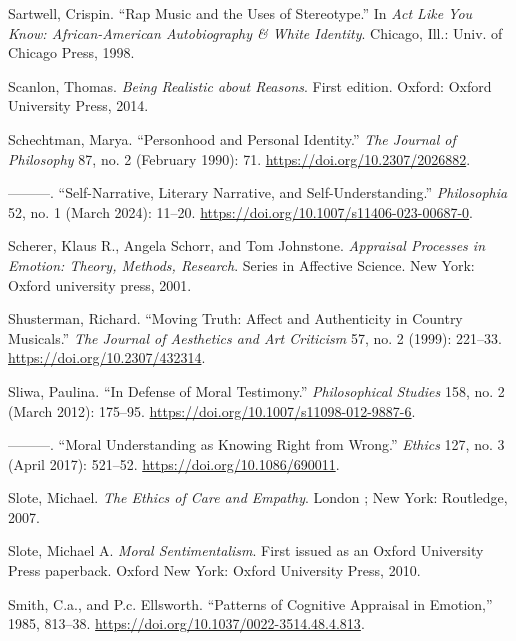 \documentclass[phdthesis,12pt,final]{wuthesis}
\newlength{\cslhangindent}
\newenvironment{CSLReferences}[2] %
{\begin{list}{}{%
	\setlength{\itemindent}{0pt}
	\setlength{\leftmargin}{0pt}
	\setlength{\parsep}{0pt}
	\ifodd #1
	\setlength{\leftmargin}{\cslhangindent}
	\setlength{\itemindent}{-1\cslhangindent}
	\fi
	\setlength{\itemsep}{#2\baselineskip}}}
{\end{list}}
\theoremstyle{definition}
\theoremstyle{definition}
\theoremstyle{definition}
\theoremstyle{definition}
\theoremstyle{remark}
\begin{document}
\begin{CSLReferences}{1}{0}
Sartwell, Crispin. {``Rap {Music} and the {Uses} of {Stereotype}.''} In \emph{Act Like You Know: {African-American} Autobiography \& White Identity}. Chicago, Ill.: Univ. of Chicago Press, 1998.

Scanlon, Thomas. \emph{Being Realistic about Reasons}. First edition. Oxford: Oxford University Press, 2014.

Schechtman, Marya. {``Personhood and {Personal Identity}.''} \emph{The Journal of Philosophy} 87, no. 2 (February 1990): 71. \url{https://doi.org/10.2307/2026882}.

---------. {``Self-{Narrative}, {Literary Narrative}, and {Self-Understanding}.''} \emph{Philosophia} 52, no. 1 (March 2024): 11--20. \url{https://doi.org/10.1007/s11406-023-00687-0}.

Scherer, Klaus R., Angela Schorr, and Tom Johnstone. \emph{Appraisal Processes in Emotion: Theory, Methods, Research}. Series in Affective Science. New York: Oxford university press, 2001.

Shusterman, Richard. {``Moving {Truth}: {Affect} and {Authenticity} in {Country Musicals}.''} \emph{The Journal of Aesthetics and Art Criticism} 57, no. 2 (1999): 221--33. \url{https://doi.org/10.2307/432314}.

Sliwa, Paulina. {``In Defense of Moral Testimony.''} \emph{Philosophical Studies} 158, no. 2 (March 2012): 175--95. \url{https://doi.org/10.1007/s11098-012-9887-6}.

---------. {``Moral {Understanding} as {Knowing Right} from {Wrong}.''} \emph{Ethics} 127, no. 3 (April 2017): 521--52. \url{https://doi.org/10.1086/690011}.

Slote, Michael. \emph{The {Ethics} of {Care} and {Empathy}}. London ; New York: Routledge, 2007.

Slote, Michael A. \emph{Moral {Sentimentalism}}. First issued as an Oxford University Press paperback. Oxford New York: Oxford University Press, 2010.

Smith, C.a., and P.c. Ellsworth. {``Patterns of {Cognitive Appraisal} in {Emotion},''} 1985, 813--38. \url{https://doi.org/10.1037/0022-3514.48.4.813}.


\end{CSLReferences}
\end{document}
